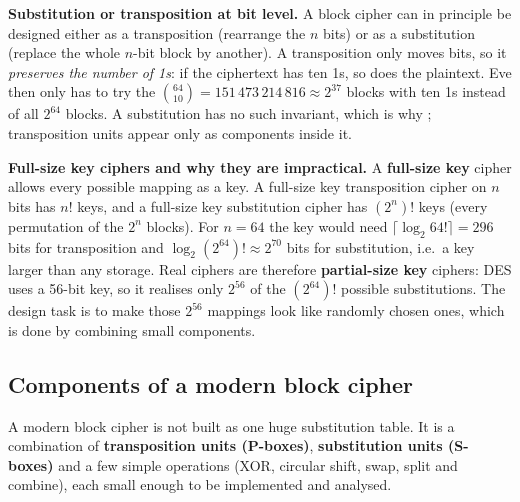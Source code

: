 \textbf{Substitution or transposition at bit level.} A block cipher can in principle be designed either as a transposition (rearrange the $n$ bits) or as a substitution (replace the whole $n$-bit block by another). A transposition only moves bits, so it \emph{preserves the number of 1s}: if the ciphertext has ten 1s, so does the plaintext. Eve then only has to try the $\binom{64}{10} = 151\,473\,214\,816 \approx 2^{37}$ blocks with ten 1s instead of all $2^{64}$ blocks. A substitution has no such invariant, which is why ; transposition units appear only as components inside it.

\textbf{Full-size key ciphers and why they are impractical.} A \textbf{full-size key} cipher allows every possible mapping as a key. A full-size key transposition cipher on $n$ bits has $n!$ keys, and a full-size key substitution cipher has $(2^n)!$ keys (every permutation of the $2^n$ blocks). For $n = 64$ the key would need $\lceil \log_2 64! \rceil = 296$ bits for transposition and $\log_2 (2^{64})! \approx 2^{70}$ bits for substitution, i.e.\ a key larger than any storage. Real ciphers are therefore \textbf{partial-size key} ciphers: DES uses a 56-bit key, so it realises only $2^{56}$ of the $(2^{64})!$ possible substitutions. The design task is to make those $2^{56}$ mappings look like randomly chosen ones, which is done by combining small components.

\subsection{Components of a modern block cipher}
A modern block cipher is not built as one huge substitution table. It is a combination of \textbf{transposition units (P-boxes)}, \textbf{substitution units (S-boxes)} and a few simple operations (XOR, circular shift, swap, split and combine), each small enough to be implemented and analysed.

